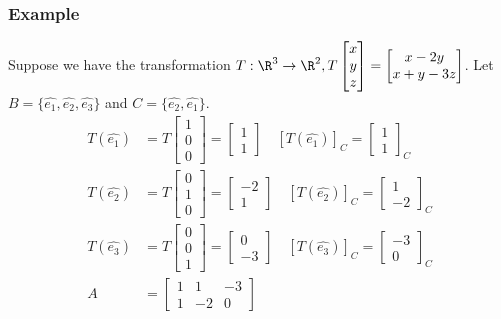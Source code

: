 \documentclass{math}
\begin{document}
\subsubsection*{Example}
Suppose we have the transformation \( T:\R^3\to\R^2, T\begin{bmatrix}x \\ y \\
z\end{bmatrix} = \begin{bmatrix}x-2y \\ x+y-3z\end{bmatrix} \). Let
\( B = \{\hat{e_1},\hat{e_2},\hat{e_3}\} \) and \( C = \{\hat{e_2},\hat{e_1}\}
\).
\begin{align*}
  T(\hat{e_1}) &= T\begin{bmatrix}1 \\ 0 \\ 0\end{bmatrix} =
    \begin{bmatrix}1 \\ 1\end{bmatrix} \quad
    [T(\hat{e_1})]_C = \begin{bmatrix}1 \\ 1\end{bmatrix}_C \\
  T(\hat{e_2}) &= T\begin{bmatrix}0 \\ 1 \\ 0\end{bmatrix} =
    \begin{bmatrix}-2 \\ 1\end{bmatrix} \quad
    [T(\hat{e_2})]_C = \begin{bmatrix}1 \\ -2\end{bmatrix}_C \\
  T(\hat{e_3}) &= T\begin{bmatrix}0 \\ 0 \\ 1\end{bmatrix} =
    \begin{bmatrix}0 \\ -3\end{bmatrix} \quad
    [T(\hat{e_3})]_C = \begin{bmatrix}-3 \\ 0\end{bmatrix}_C \\
  A &= \begin{bmatrix}
    1 & 1 & -3 \\
    1 & -2 & 0
  \end{bmatrix}
\end{align*}
\end{document}
